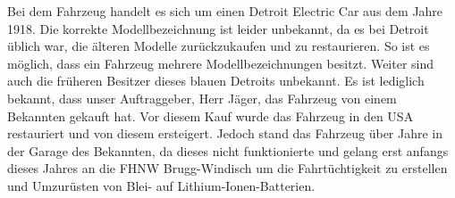 Bei dem Fahrzeug handelt es sich um einen Detroit Electric Car aus dem Jahre 1918. Die korrekte Modellbezeichnung ist leider unbekannt, da es bei Detroit üblich war, die älteren Modelle zurückzukaufen und zu restaurieren. So ist es möglich, dass ein Fahrzeug mehrere Modellbezeichnungen besitzt. Weiter sind auch die früheren Besitzer dieses blauen Detroits unbekannt. Es ist lediglich bekannt, dass unser Auftraggeber, Herr Jäger, das Fahrzeug von einem Bekannten gekauft hat. Vor diesem Kauf wurde das Fahrzeug in den USA restauriert und von diesem ersteigert. Jedoch stand das Fahrzeug über Jahre in der Garage des Bekannten, da dieses nicht funktionierte und gelang erst anfangs dieses Jahres an die FHNW Brugg-Windisch um die Fahrtüchtigkeit zu erstellen und Umzurüsten von Blei- auf Lithium-Ionen-Batterien.

\newpage